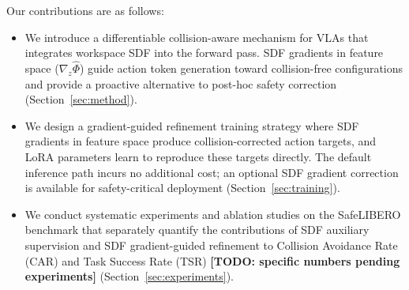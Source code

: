 Our contributions are as follows:
\begin{itemize}
    \item We introduce a differentiable collision-aware mechanism for VLAs that integrates workspace SDF into the forward pass. SDF gradients in feature space ($\nabla_z \hat{\Phi}$) guide action token generation toward collision-free configurations and provide a proactive alternative to post-hoc safety correction (Section~\ref{sec:method}).
    \item We design a gradient-guided refinement training strategy where SDF gradients in feature space produce collision-corrected action targets, and LoRA parameters learn to reproduce these targets directly. The default inference path incurs no additional cost; an optional SDF gradient correction is available for safety-critical deployment (Section~\ref{sec:training}).
    \item We conduct systematic experiments and ablation studies on the SafeLIBERO benchmark that separately quantify the contributions of SDF auxiliary supervision and SDF gradient-guided refinement to Collision Avoidance Rate (CAR) and Task Success Rate (TSR) \textbf{[TODO: specific numbers pending experiments]} (Section~\ref{sec:experiments}).
\end{itemize}